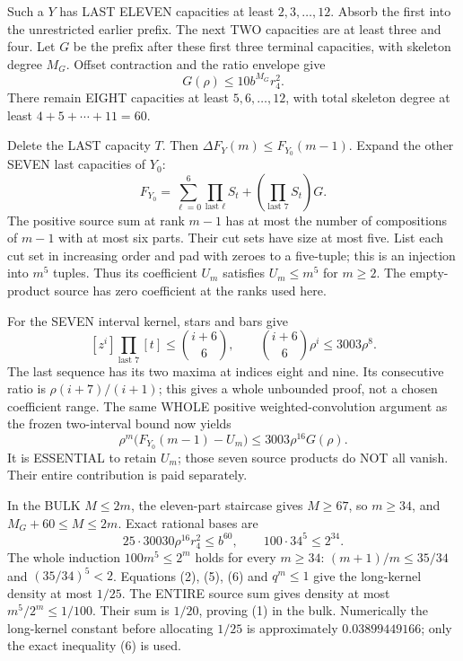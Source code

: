 Such a $Y$ has LAST ELEVEN capacities at least $2,3,\ldots,12$.
Absorb the first into the unrestricted earlier prefix. The next TWO
capacities are at least three and four. Let $G$ be the prefix after
these first three terminal capacities, with skeleton degree $M_G$.
Offset contraction and the ratio envelope give
\[
                      G(\rho)\le10b^{M_G}r_4^2.       \tag{2}
\]
There remain EIGHT capacities at least $5,6,\ldots,12$, with total
skeleton degree at least $4+5+\cdots+11=60$.

Delete the LAST capacity $T$. Then
$\Delta F_Y(m)\le F_{Y_0}(m-1)$.
Expand the other SEVEN last capacities of $Y_0$:
\[
 F_{Y_0}=\sum_{\ell=0}^6\prod_{\text{last }\ell}S_t
             +\left(\prod_{\text{last }7}S_t\right)G.          \tag{3}
\]
The positive source sum at rank $m-1$ has at most the number of
compositions of $m-1$ with at most six parts. Their cut sets have size
at most five. List each cut set in increasing order and pad with zeroes
to a five-tuple; this is an injection into $m^5$ tuples. Thus its
coefficient $U_m$ satisfies $U_m\le m^5$ for $m\ge2$.
The empty-product source has zero coefficient at the ranks used here.

For the SEVEN interval kernel, stars and bars give
\[
 [z^i]\prod_{\text{last }7}[t]\le\binom{i+6}{6},\qquad
                \binom{i+6}{6}\rho^i\le3003\rho^8.     \tag{4}
\]
The last sequence has its two maxima at indices eight and nine.
Its consecutive ratio is $\rho(i+7)/(i+1)$; this gives a whole
unbounded proof, not a chosen coefficient range. The same WHOLE
positive weighted-convolution argument as the frozen two-interval
bound now yields
\[
 \rho^m\bigl(F_{Y_0}(m-1)-U_m\bigr)
                         \le3003\rho^{16}G(\rho).    \tag{5}
\]
It is ESSENTIAL to retain $U_m$; those seven source products do NOT
all vanish. Their entire contribution is paid separately.

In the BULK $M\le2m$, the eleven-part staircase gives $M\ge67$,
so $m\ge34$, and $M_G+60\le M\le2m$. Exact rational bases are
\[
 25\cdot30030\rho^{16}r_4^2\le b^{60},\qquad
              100\cdot34^5\le2^{34}.                 \tag{6}
\]
The whole induction $100m^5\le2^m$ holds for every $m\ge34$:
$(m+1)/m\le35/34$ and $(35/34)^5<2$.
Equations (2), (5), (6) and $q^m\le1$ give the long-kernel
density at most $1/25$. The ENTIRE source sum gives density at most
$m^5/2^m\le1/100$. Their sum is $1/20$, proving (1) in the bulk.
Numerically the long-kernel constant before allocating $1/25$ is
approximately $0.03899449166$; only the exact inequality (6) is used.

